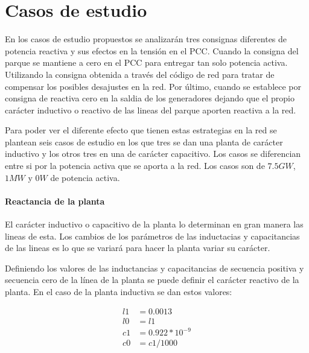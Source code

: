 \documentclass{book}
\begin{document}
	\section{Casos de estudio}

En los casos de estudio propuestos se analizar\'an tres consignas diferentes de potencia reactiva y sus efectos en la tensi\'on en el PCC. Cuando la consigna del parque se mantiene a cero en el PCC para entregar tan solo potencia activa. Utilizando la consigna obtenida a trav\'es del c\'odigo de red para tratar de compensar los posibles desajustes en la red. Por \'ultimo, cuando se establece por consigna de reactiva cero en la saldia de los generadores dejando que el propio car\'acter inductivo o reactivo de las lineas del parque aporten reactiva a la red. \par

Para poder ver el diferente efecto que tienen estas estrategias en la red se plantean seis casos de estudio en los que tres se dan una planta de car\'acter inductivo y los otros tres en una de car\'acter capacitivo. Los casos se diferencian entre si por la potencia activa que se aporta a la red. Los casos son de $7.5 GW$, $1MW$ y $0W$ de potencia activa.  \par

\paragraph{Reactancia de la planta}

El car\'acter inductivo o capacitivo de la planta lo determinan en gran manera las lineas de esta. Los cambios de los par\'ametros de las inductacias y capacitancias de las lineas es lo que se variar\'a para hacer la planta variar su car\'acter. \par

Definiendo los valores de las inductancias y capacitancias de secuencia positiva y secuencia cero de la l\'inea de la planta se puede definir el car\'acter reactivo de la planta. En el caso de la planta inductiva se dan estos valores:

\begin{equation}
\begin{split}
l1 & =0.0013 \\
l0 & =l1\\
c1 & =0.922* 10^{-9} \\
c0 & =c1/1000 \\
\end{split}
\end{equation}
\end{document}
